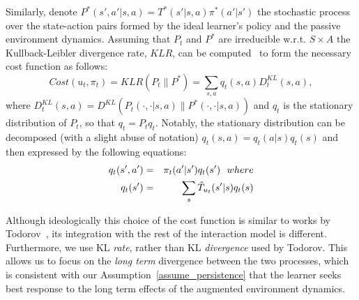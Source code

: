 \documentclass[letterpaper]{aamas2010}
\begin{document}
Similarly, denote $P^*(s',a'|s,a)=T^*(s'|s,a)\pi^*(a'|s')$ the
stochastic process over the state-action pairs formed by the ideal
learner's policy and the passive environment dynamics.  Assuming that
$P_t$ and $P^*$ are irreducible w.r.t. $S\times A$ the
Kullback-Leibler divergence rate, $KLR$, can be
computed~\cite{rached_alajaji_campbell_2004} to form the necessary
cost function as follows:
$$
Cost(u_t,\pi_t)=KLR(P_t\|P^*)=\sum\limits_{s,a}q_t(s,a)D^{KL}_t(s,a),$$
where
$D^{KL}_t(s,a)=D^{KL}(P_t(\cdot,\cdot|s,a)\|P^*(\cdot,\cdot|s,a))$ and
$q_t$ is the stationary distribution of $P_t$, so that
$q_t=P_tq_t$. Notably, the stationary distribution can be decomposed
(with a slight abuse of notation) $q_t(s,a)=q_t(a|s)q_t(s)$ and then
expressed by the following equations:
\begin{eqnarray*}
q_t(s',a')&=&\pi_t(a'|s')q_t(s')\ \ \displaystyle{where}\\
q_t(s')&=&\sum\limits_s\Tilde{T}_{u_t}(s'|s)q_t(s)
\end{eqnarray*}

Although ideologically this choice of the cost function is similar to
works by
Todorov~\cite{todorov_2009_framework,todorov_2009_framework_sup}, its
integration with the rest of the interaction model is
different. Furthermore, we use KL {\em rate}, rather than KL {\em
  divergence} used by Todorov. This allows us to focus on the {\em
  long term} divergence between the two processes, which is consistent
with our Assumption~\ref{assume_persistence} that the learner seeks
best response to the long term effects of the augmented environment
dynamics.
\end{document}
